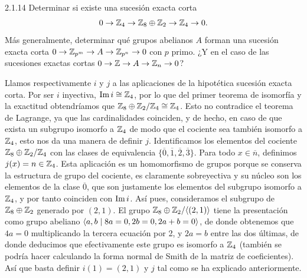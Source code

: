 \documentclass[twoside]{article}
\begin{document}
\begin{ejercicio}{2.1.14}
Determinar si existe una sucesión exacta corta $$0\to\mathbb{Z}_4\to \mathbb{Z}_8\oplus\mathbb{Z}_2\to \mathbb{Z}_4\to 0.$$ Más generalmente, determinar qué grupos abelianos $A$ forman una sucesión exacta corta $0\to\mathbb{Z}_{p^m}\to A\to\mathbb{Z}_{p^n}\to 0$ con $p$ primo. ¿Y en el caso de las sucesiones exactas cortas $0\to\mathbb{Z}\to A\to\mathbb{Z}_n\to 0$?
\end{ejercicio}
\begin{solucion}
Llamos respectivamente $i$ y $j$ a las aplicaciones de la hipotética sucesión exacta corta. Por ser $i$ inyectiva, $\operatorname{Im}{i}\cong\mathbb{Z}_4$, por lo que del primer teorema de isomorfía y la exactitud obtendríamos que $\mathbb{Z}_8\oplus\mathbb{Z}_2/\mathbb{Z}_4\cong\mathbb{Z}_4$. Esto no contradice el teorema de Lagrange, ya que las cardinalidades coinciden, y de hecho, en caso de que exista un subgrupo isomorfo a $\mathbb{Z}_4$ de modo que el cociente sea también isomorfo a $\mathbb{Z}_4$, esto nos da una manera de definir $j$. Identificamos los elementos del cociente $\mathbb{Z}_8\oplus\mathbb{Z}_2/\mathbb{Z}_4$ con las clases de equivalencia $\{\overline{0}, \overline{1},\overline{2},\overline{3}\}$. Para todo $x\in\overline{n}$, definimos $j(x)=n\in\mathbb{Z}_4$. Esta aplicación es un homomorfismo de grupos porque se conserva la estructura de grupo del cociente, es claramente sobreyectiva y su núcleo son los elementos de la clase $\overline{0}$, que son justamente los elementos del subgrupo isomorfo a $\mathbb{Z}_4$, y por tanto coinciden con $\operatorname{Im}{i}$. Así pues, consideramos el subgrupo de $\mathbb{Z}_8\oplus\mathbb{Z}_2$ generado por $(2,1)$. El grupo $\mathbb{Z}_8\oplus\mathbb{Z}_2/\langle{(2,1)}\rangle$ tiene la presentación como grupo abeliano $\langle{a,b\mid 8a=0,2b=0, 2a+b=0}\rangle$, de donde obtenemos que $4a=0$ multiplicando la tercera ecuación por 2, y  $2a=b$ entre las dos últimas, de donde deducimos que efectivamente este grupo es isomorfo a $\mathbb{Z}_4$ (también se podría hacer calculando la forma normal de Smith de la matriz de coeficientes). Así que basta definir $i(1)=(2,1)$ y $j$ tal como se ha explicado anteriormente.


\end{solucion}
\end{document}
